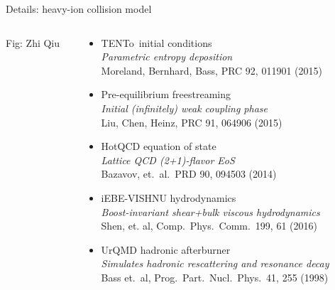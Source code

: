 \documentclass{beamer}
\newcommand{\trento}{T\raisebox{-0.3ex}{R}ENTo}
\begin{document}
\begin{frame}{Details: heavy-ion collision model}
\begin{columns}[T]
\begin{column}{.2\textwidth}
        \tiny Fig: Zhi Qiu
      \end{column}
      \begin{column}{.7\textwidth}
        \begin{itemize}
          \item \textcolor{theme}{\trento\ initial conditions} \\[.5ex]
            {\scriptsize \emph{Parametric entropy deposition}\\
            Moreland, Bernhard, Bass, PRC 92, 011901 (2015)}
          \item \textcolor{theme}{Pre-equilibrium freestreaming} \\[.5ex]
            {\scriptsize \emph{Initial (infinitely) weak coupling phase} \\
            Liu, Chen, Heinz, PRC 91, 064906 (2015)} 
          \item \textcolor{theme}{HotQCD equation of state} \\[.5ex]
            {\scriptsize \emph{Lattice QCD (2+1)-flavor EoS} \\
            Bazavov, et.\ al.\ PRD 90, 094503 (2014)} \\
          \item \textcolor{theme}{iEBE-VISHNU hydrodynamics} \\[.5ex]
            {\scriptsize \emph{Boost-invariant shear+bulk viscous hydrodynamics}\\
            Shen, et. al, Comp.\ Phys.\ Comm.\ 199, 61 (2016)}  
          \item \textcolor{theme}{UrQMD hadronic afterburner} \\[.5ex]
            {\scriptsize \emph{Simulates hadronic rescattering and resonance decay} \\
            Bass et.\ al, Prog.\ Part.\ Nucl.\ Phys.\ 41, 255 (1998)}
        \end{itemize}
      \end{column}
      \begin{column}{.025\textwidth}
      \end{column}
    \end{columns}

\end{frame}
\end{document}
